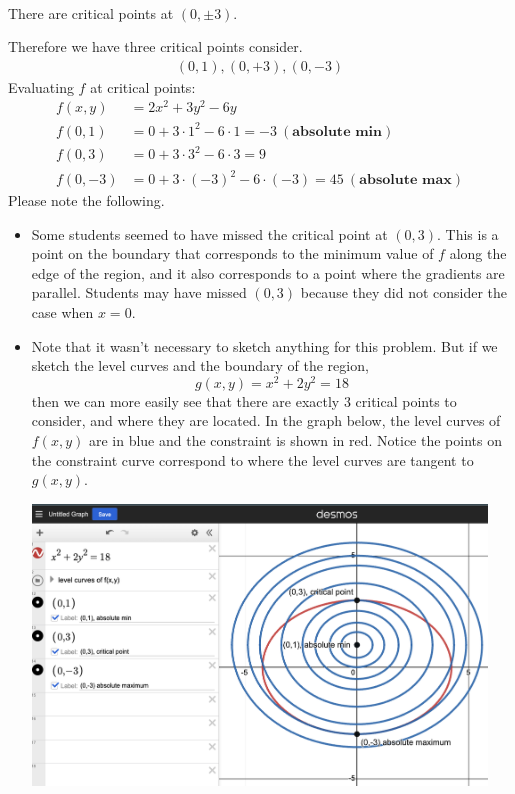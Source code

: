 {\begin{itemize}
\begin{align}
        \end{align}
        There are critical points at $(0, \pm 3)$. 
    \end{itemize}
    Therefore we have three critical points consider. 
    \begin{align}
        (0,1), (0,+3), (0,-3)
    \end{align}
    Evaluating $f$ at critical points: 
    \begin{align}
        f(x,y) &= 2x^2 + 3y^2 - 6y\\
        f(0,1) &= 0 + 3 \cdot 1^2 - 6\cdot 1 = -3 \ (\textbf{absolute min})\\ 
        f(0,3) &= 0 + 3\cdot 3^2 - 6\cdot 3 = 9 \\
        f(0,-3) &= 0 + 3 \cdot (-3)^2 - 6 \cdot (-3) = 45 \ (\textbf{absolute max})
    \end{align}
    Please note the following. 
    \begin{itemize}
        \item Some students seemed to have missed the critical point at $(0,3)$. This is a point on the boundary that corresponds to the minimum value of $f$ along the edge of the region, and it also corresponds to a point where the gradients are parallel. Students may have missed $(0,3)$ because they did not consider the case when $x=0$. 
        \item Note that it wasn't necessary to sketch anything for this problem. But if we sketch the level curves and the boundary of the region, $$g(x,y) = x^2+2y^2 = 18$$ then we can more easily see that there are exactly 3 critical points to consider, and where they are located. In the graph below, the level curves of $f(x,y)$ are in blue and the constraint is shown in red. Notice the points on the constraint curve correspond to where the level curves are tangent to $g(x,y)$. 
    \begin{center}
        \includegraphics[width=0.95\textwidth]{202402/Exam2/Images/LagrangeCritPoints.png}
    \end{center}
    \end{itemize}    
    
    } 
   \else
      

